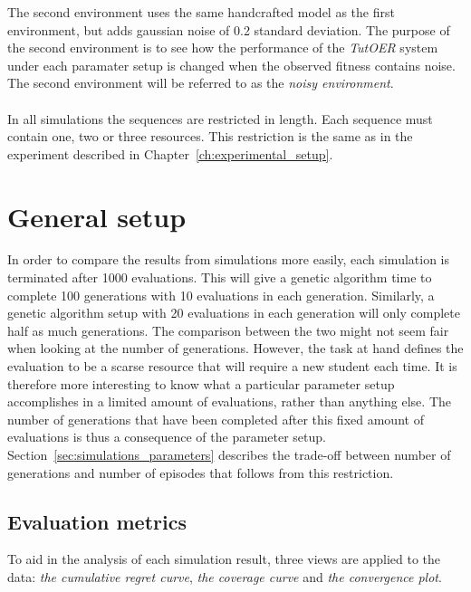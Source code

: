 \noindent
The second environment uses the same handcrafted model as the first
environment, but adds gaussian noise of 0.2 standard deviation. The purpose of
the second environment is to see how the performance of the \emph{TutOER}
system under each paramater setup is changed when the observed fitness contains
noise. The second environment will be referred to as the \emph{noisy
environment}.\\\\
\noindent
In all simulations the sequences are restricted in length. Each sequence must
contain one, two or three resources. This restriction is the same as in the
experiment described in Chapter~\ref{ch:experimental_setup}.
\section{General setup}
\label{sec:simulations_setup}
In order to compare the results from simulations more easily, each
simulation is terminated after 1000 evaluations. This will give
a genetic algorithm time to complete 100 generations with 10 evaluations in
each generation. Similarly, a genetic algorithm setup with 20 evaluations in
each generation will only complete half as much generations. The comparison
between the two might not seem fair when looking at the number of generations.
However, the task at hand defines the evaluation to be a scarse resource that
will require a new student each time. It is therefore more interesting to know
what a particular parameter setup accomplishes in a limited amount of
evaluations, rather than anything else. The number of generations that have
been completed after this fixed amount of evaluations is thus a consequence of
the parameter setup. Section~\ref{sec:simulations_parameters} describes the
trade-off between number of generations and number of episodes that follows
from this restriction.
\subsection{Evaluation metrics}
To aid in the analysis of each simulation result, three views are applied to
the data: \emph{the cumulative regret curve}, \emph{the coverage curve} and
\emph{the convergence plot}.
